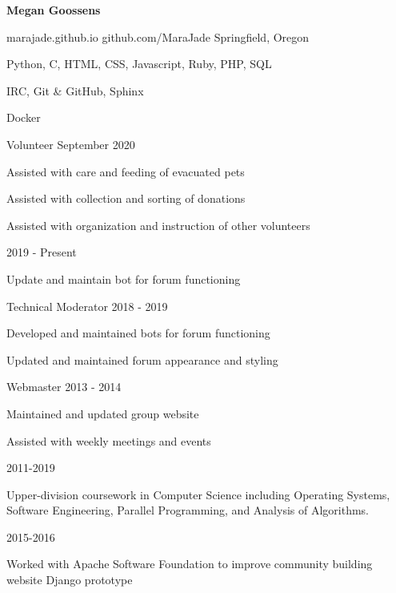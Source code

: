 \documentclass[11pt]{article} %
\begin{document}
\centerline{{\Huge \bf Megan Goossens}}
\bigskip


        {marajade.github.io}
        {github.com/MaraJade}
        {Springfield, Oregon}



      {Python, C, HTML, CSS, Javascript, Ruby, PHP, SQL}

      {IRC, Git \& GitHub, Sphinx}

      {Docker}


\begin{description}
\squish

           {Volunteer}
           {September 2020}

Assisted with care and feeding of evacuated pets

Assisted with collection and sorting of donations

Assisted with organization and instruction of other volunteers

            {}
            {2019 - Present}

Update and maintain bot for forum functioning

            {Technical Moderator}
            {2018 - 2019}

Developed and maintained bots for forum functioning

Updated and maintained forum appearance and styling

           {Webmaster}
           {2013 - 2014}

Maintained and updated group website
    
Assisted with weekly meetings and events

\end{description}


\begin{description}
\squish
{}
           {}
           {2011-2019}

Upper-division coursework in Computer Science including Operating Systems,\\
Software Engineering, Parallel Programming, and Analysis of Algorithms.


           {}
           {2015-2016}

Worked with Apache Software Foundation to improve community building website
Django prototype

\end{description}
\end{document}
